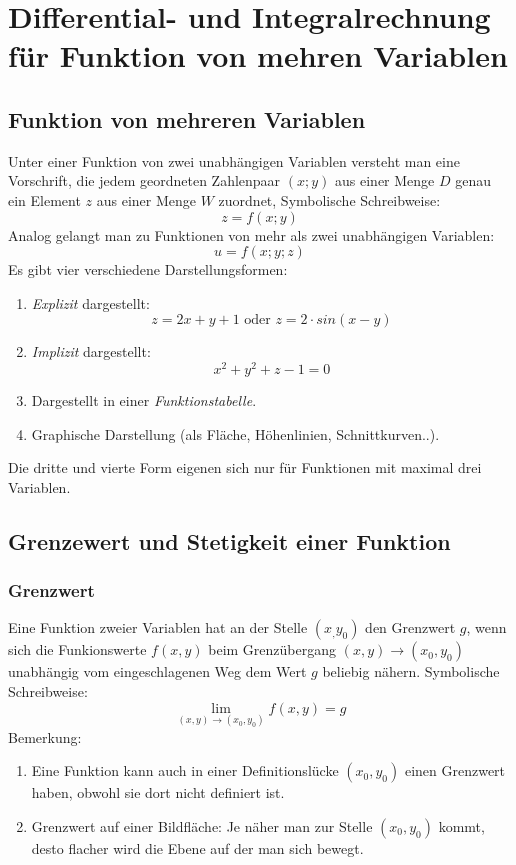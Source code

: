 \chapter{Differential- und Integralrechnung für Funktion von mehren Variablen}
\section{Funktion von mehreren Variablen}
\begin{definition}
Unter einer Funktion von zwei unabhängigen Variablen versteht man eine Vorschrift, die jedem geordneten Zahlenpaar $(x;y)$ aus einer Menge $D$ genau ein Element $z$ aus einer Menge $W$ zuordnet, Symbolische Schreibweise: $$z=f(x;y)$$
Analog gelangt man zu Funktionen von mehr als zwei unabhängigen Variablen:
$$u=f(x;y;z)$$
Es gibt vier verschiedene Darstellungsformen:
\begin{enumerate}
	\item \textit{Explizit} dargestellt:
	$$z = 2x + y + 1 \text{ oder } z = 2 \cdot sin(x-y)$$
	\item \textit{Implizit} dargestellt:
	$$ x^2 + y^2+z -1 = 0$$
	\item Dargestellt in einer \textit{Funktionstabelle}.
	\item Graphische Darstellung (als Fläche, Höhenlinien, Schnittkurven..).
\end{enumerate}
Die dritte und vierte Form eigenen sich nur für Funktionen mit maximal drei Variablen.
\end{definition}

\section{Grenzewert und Stetigkeit einer Funktion}
\subsection{Grenzwert}
\begin{definition}
Eine Funktion zweier Variablen hat an der Stelle $(x_,y_0)$ den Grenzwert $g$, wenn sich die Funkionswerte $f(x,y)$ beim Grenzübergang $(x,y) \rightarrow (x_0,y_0)$ unabhängig vom eingeschlagenen Weg dem Wert $g$ beliebig nähern. Symbolische Schreibweise:
$$\lim\limits_{(x,y) \rightarrow (x_0,y_0)} f(x,y) = g$$
Bemerkung:
\begin{enumerate}
\item Eine Funktion kann auch in einer Definitionslücke $(x_0,y_0)$ einen Grenzwert haben, obwohl sie dort nicht definiert ist.
\item Grenzwert auf einer Bildfläche: Je näher man zur Stelle $(x_0,y_0)$ kommt, desto flacher wird die Ebene auf der man sich bewegt.
\end{enumerate}
\end{definition}


